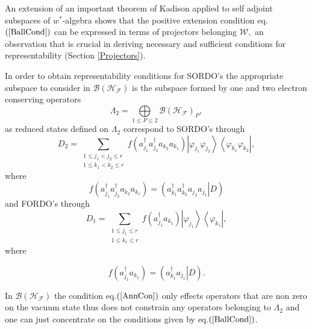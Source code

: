 \documentclass[aps,preprint,amsfonts,amssymb,showpacs,showkeys]{revtex4}%
\begin{document}
An extension of an important theorem of Kadison \cite{Kadison} applied to self
adjoint subspaces of $w^{\ast}$-algebra shows that the positive extension
condition eq.$\left(  \ref{BallCond}\right)  $ can be expressed in terms of
projectors belonging $\mathcal{W},$ an observation that is crucial in deriving
necessary and sufficient conditions for representability (Section
\ref{Projectors}).

In order to obtain representability conditions for SORDO's the appropriate
subspace to consider in $\mathcal{B}\left(  \mathcal{H}_{\mathcal{F}}\right)
$ is the subspace formed by one and two electron conserving operators
\begin{equation}
\Lambda_{2}=%
{\displaystyle\bigoplus\limits_{1\leq P\leq2}}
\mathcal{B}\left(  \mathcal{H}_{\mathcal{F}}\right)  _{P},
\end{equation}
as reduced states defined on $\Lambda_{2}$ correspond to SORDO's through%
\begin{equation}
D_{2}=\sum_{\substack{1\leq j_{1}<j_{2}\leq r\\1\leq k_{1}<k_{2}\leq
r}}f\left(  a_{j_{1}}^{\dagger}a_{j_{2}}^{\dagger}a_{k_{2}}a_{k_{1}}\right)
\left\vert \varphi_{j_{1}}\varphi_{j_{2}}\right\rangle \left\langle
\varphi_{k_{1}}\varphi_{k_{2}}\right\vert ,
\end{equation}
where%
\begin{equation}
f\left(  a_{j_{1}}^{\dagger}a_{j_{2}}^{\dagger}a_{k_{2}}a_{k_{1}}\right)
=\left(  \left.  a_{k_{1}}^{\dagger}a_{k_{2}}^{\dagger}a_{j_{2}}a_{j_{1}%
}\right\vert D\right)
\end{equation}
and FORDO's through
\begin{equation}
D_{1}=\sum_{\substack{1\leq j_{1}\leq r\\1\leq k_{1}\leq r}}f\left(  a_{j_{1}%
}^{\dagger}a_{k_{1}}\right)  \left\vert \varphi_{j_{1}}\right\rangle
\left\langle \varphi_{k_{1}}\right\vert ,
\end{equation}
where%

\begin{equation}
f\left(  a_{j_{1}}^{\dagger}a_{k_{1}}\right)  =\left(  \left.  a_{k_{1}%
}^{\dagger}a_{j_{1}}\right\vert D\right)  .
\end{equation}


In $\mathcal{B}\left(  \mathcal{H}_{\mathcal{F}}\right)  $ the condition
eq.$\left(  \ref{AnnCon}\right)  $ only effects operators that are non zero on
the vacuum state thus does not constrain any operators belonging to
$\Lambda_{2}$ and one can just concentrate on the conditions given by
eq.$\left(  \ref{BallCond}\right)  $.
\end{document}

